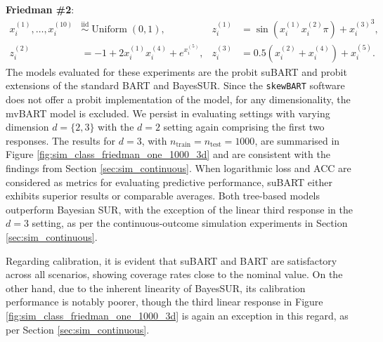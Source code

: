 \documentclass[aoas,preprint]{imsart}
\theoremstyle{plain}
\theoremstyle{definition}
\theoremstyle{remark}
\begin{document}
\noindent\textbf{Friedman \#2}:
\begin{align*}
x_{i}^{(1)}, \ldots, x_{i}^{(10)} &\overset{\mathrm{iid}}{\sim} \operatorname{Uniform}(0, 1), &
z_{i}^{(1)} &= \sin(x_{i}^{(1)} x_{i}^{(2)} \pi) + {x_{i}^{(3)}}^{3}, \\
z_{i}^{(2)} &= -1 + 2x_{i}^{(1)}x_{i}^{(4)} +e^{x_{i}^{(5)}},&
z_{i}^{(3)} &= 0.5(x_{i}^{(2)} +  x_{i}^{(4)}) + x_{i}^{(5)}.
\end{align*}
\indent The models evaluated for these experiments are the probit suBART and probit extensions of the standard BART and BayesSUR. Since the \texttt{skewBART} software does not offer a probit implementation of the model, for any dimensionality, the mvBART model is excluded. 
We persist in evaluating settings with varying dimension $d=\{2,3\}$ with the $d=2$ setting again comprising the first two responses.
The results for $d=3$, with $n_{\operatorname{train}}=n_{\operatorname{test}}=1000$, are summarised in 
Figure \ref{fig:sim_class_friedman_one_1000_3d} and  are consistent with the findings from Section \ref{sec:sim_continuous}. When logarithmic loss and ACC are considered as metrics for evaluating predictive performance, suBART either exhibits superior results or comparable averages. Both tree-based models outperform Bayesian SUR, with the exception of the linear third response in the $d=3$ setting, as per the continuous-outcome simulation experiments in Section \ref{sec:sim_continuous}.

Regarding calibration, it is evident that suBART and BART are satisfactory across all scenarios, showing coverage rates close to the nominal value. On the other hand, due to the inherent linearity of BayesSUR, its calibration performance is notably poorer, though the third linear response in Figure \ref{fig:sim_class_friedman_one_1000_3d} is again an exception in this regard, as per Section \ref{sec:sim_continuous}. 
\end{document}

